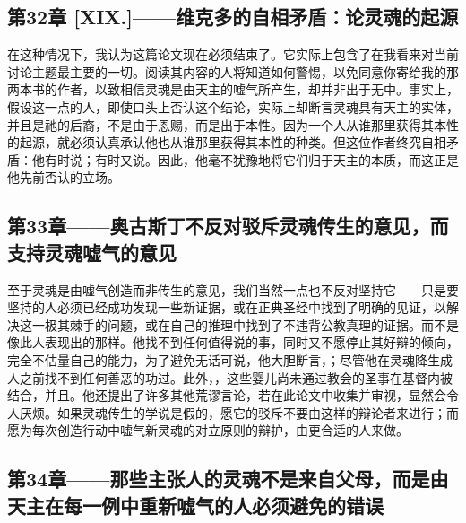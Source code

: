 
\subsection{第32章 [XIX.]——维克多的自相矛盾：论灵魂的起源}

在这种情况下，我认为这篇论文现在必须结束了。它实际上包含了在我看来对当前讨论主题最主要的一切。阅读其内容的人将知道如何警惕，以免同意你寄给我的那两本书的作者，以致相信灵魂是由天主的嘘气所产生，却并非出于无中。事实上，假设这一点的人，即使口头上否认这个结论，实际上却断言灵魂具有天主的实体，并且是祂的后裔，不是由于恩赐，而是出于本性。因为一个人从谁那里获得其本性的起源，就必须认真承认他也从谁那里获得其本性的种类。但这位作者终究自相矛盾：他有时说；有时又说。因此，他毫不犹豫地将它们归于天主的本质，而这正是他先前否认的立场。\par


\subsection{第33章——奥古斯丁不反对驳斥灵魂传生的意见，而支持灵魂嘘气的意见}

至于灵魂是由嘘气创造而非传生的意见，我们当然一点也不反对坚持它——只是要坚持的人必须已经成功发现一些新证据，或在正典圣经中找到了明确的见证，以解决这一极其棘手的问题，或在自己的推理中找到了不违背公教真理的证据。而不是像此人表现出的那样。他找不到任何值得说的事，同时又不愿停止其好辩的倾向，完全不估量自己的能力，为了避免无话可说，他大胆断言，；尽管他在灵魂降生成人之前找不到任何善恶的功过。此外，，这些婴儿尚未通过教会的圣事在基督内被结合，并且。他还提出了许多其他荒谬言论，若在此论文中收集并审视，显然会令人厌烦。如果灵魂传生的学说是假的，愿它的驳斥不要由这样的辩论者来进行；而愿为每次创造行动中嘘气新灵魂的对立原则的辩护，由更合适的人来做。\par


\subsection{第34章——那些主张人的灵魂不是来自父母，而是由天主在每一例中重新嘘气的人必须避免的错误}

